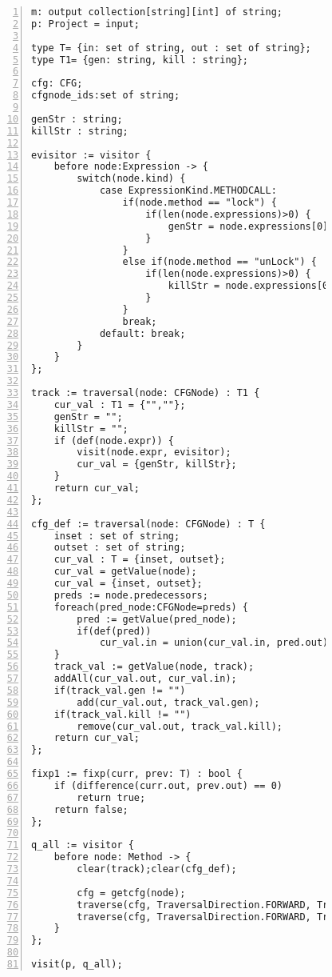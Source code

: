\begin{figure}[ht!]
\begin{lstlisting}[numbers=left, tabsize=4, escapechar=@, caption={Safe syncronization},label={lst:safe-code}, lastline = 55] 
m: output collection[string][int] of string;
p: Project = input;

type T= {in: set of string, out : set of string};
type T1= {gen: string, kill : string};

cfg: CFG;
cfgnode_ids:set of string;

genStr : string;
killStr : string; 

evisitor := visitor {
	before node:Expression -> {
		switch(node.kind) {
			case ExpressionKind.METHODCALL: 
				if(node.method == "lock") {
					if(len(node.expressions)>0) {
						genStr = node.expressions[0].variable;
					}
				}
				else if(node.method == "unLock") {
					if(len(node.expressions)>0) {
						killStr = node.expressions[0].variable;
					}
				}
  				break;
			default: break;
		}
	}
};

track := traversal(node: CFGNode) : T1 {
	cur_val : T1 = {"",""};
	genStr = "";
	killStr = "";
	if (def(node.expr)) {
		visit(node.expr, evisitor);
		cur_val = {genStr, killStr};
	}
	return cur_val;
};

cfg_def := traversal(node: CFGNode) : T {
	inset : set of string;
	outset : set of string;
	cur_val : T = {inset, outset};
	cur_val = getValue(node);
	cur_val = {inset, outset};
	preds := node.predecessors;
	foreach(pred_node:CFGNode=preds) {
		pred := getValue(pred_node);
		if(def(pred))
			cur_val.in = union(cur_val.in, pred.out);
	}
	track_val := getValue(node, track);
	addAll(cur_val.out, cur_val.in);
	if(track_val.gen != "")
		add(cur_val.out, track_val.gen);
	if(track_val.kill != "")
		remove(cur_val.out, track_val.kill);
	return cur_val;
};

fixp1 := fixp(curr, prev: T) : bool {
	if (difference(curr.out, prev.out) == 0)
		return true;	
	return false;
};

q_all := visitor {
	before node: Method -> {
		clear(track);clear(cfg_def);

		cfg = getcfg(node);
		traverse(cfg, TraversalDirection.FORWARD, TraversalKind.HYBRID, track);
		traverse(cfg, TraversalDirection.FORWARD, TraversalKind.HYBRID, cfg_def, fixp1);
	}
};

visit(p, q_all);
\end{lstlisting}
\end{figure}